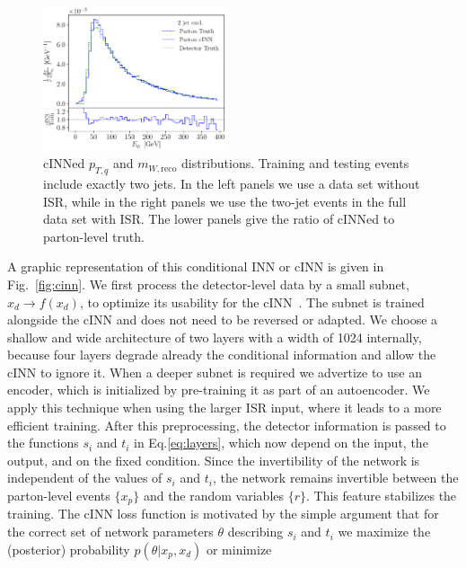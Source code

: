 \begin{figure}[t]
\includegraphics[page =19, width=0.48\textwidth]{figures/cINN/isr_2jonly_test}
\caption{cINNed $p_{T,q}$ and $m_{W,\text{reco}}$ distributions.  Training and
  testing events include exactly two jets. In the left panels we use a
  data set without ISR, while in the right panels we use the two-jet
  events in the full data set with ISR. The lower panels give the
  ratio of cINNed to parton-level truth.}
\label{fig:2j}
\end{figure}

A graphic representation of this conditional INN or cINN is given in
Fig.~\ref{fig:cinn}.  We first process the detector-level data by a
small subnet, \ie $x_d\to f(x_d)$, to optimize its usability for the cINN~\cite{cinn}. The
subnet is trained alongside the cINN and does not need to be reversed
or adapted.  We choose a shallow and wide architecture of two layers
with a width of 1024 internally, because four layers
degrade already the conditional information and allow the cINN to ignore it.
When a deeper subnet is required we advertize to use an
encoder, which is initialized by pre-training it as part of an autoencoder. We apply this technique when using the larger ISR input, where it leads to a more efficient training.  After this preprocessing, the detector information is passed
to the functions $s_i$ and $t_i$ in Eq.\eqref{eq:layers}, which now
depend on the input, the output, and on the fixed condition. Since the
invertibility of the network is independent of the values of $s_i$ and
$t_i$, the network remains invertible between the parton-level events
$\{ x_p \}$ and the random variables $\{ r \}$.  This feature
stabilizes the training. The cINN loss function is motivated by the
simple argument that for the correct set of network parameters
$\theta$ describing $s_i$ and $t_i$ we maximize the (posterior)
probability $p(\theta |x_p,x_d)$ or minimize

